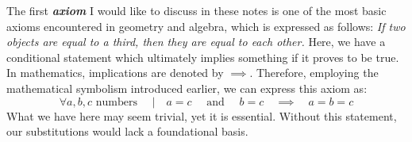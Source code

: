 The first \textbf{\textit{axiom}} I would like to discuss in these notes is one of the most basic axioms encountered in geometry and algebra, which is expressed as follows:
\textit{If two objects are equal to a third, then they are equal to each other.}
Here, we have a conditional statement which ultimately implies something if it proves to be true. In mathematics, implications are denoted by $\implies$. Therefore, employing the mathematical symbolism introduced earlier, we can express this axiom as:
\begin{equation} \label{eq:20}
  \forall a, b, c \text{ numbers }\quad |\quad a = c\quad  \text{ and }\quad  b = c\quad \implies \quad a = b = c
\end{equation}
What we have here may seem trivial, yet it is essential. Without this statement, our substitutions would lack a foundational basis.








